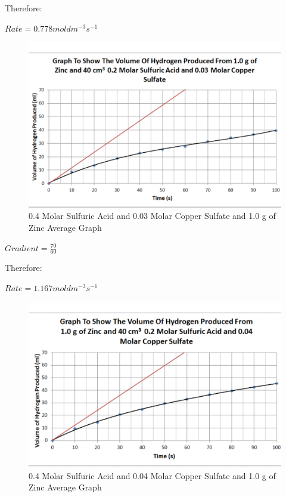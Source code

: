 Therefore:

$Rate = 0.778 mol dm^{-3} s^{-1}$

\begin{figure}[H]
    \includegraphics[width=\textwidth]{./Analysis/Images/3VaryCopperSulfate/003Molar.pdf}
    \caption{0.4 Molar Sulfuric Acid and 0.03 Molar Copper Sulfate and 1.0 g of Zinc Average Graph} \label{fig:003VaryCopperSulfate}
\end{figure}

$Gradient = \frac{70}{60}$

Therefore:

$Rate = 1.167 mol dm^{-3} s^{-1}$

\begin{figure}[H]
    \includegraphics[width=\textwidth]{./Analysis/Images/3VaryCopperSulfate/004Molar.pdf}
    \caption{0.4 Molar Sulfuric Acid and 0.04 Molar Copper Sulfate and 1.0 g of Zinc Average Graph} \label{fig:004VaryCopperSulfate}
\end{figure}

